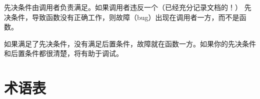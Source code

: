 先决条件由调用者负责满足。如果调用者违反一个（已经充分记录文档的！）
先决条件，导致函数没有正确工作，则故障（bug）出现在调用者一方，而不是函数。


如果满足了先决条件，没有满足后置条件，故障就在函数一方。如果你的先决条件和后置条件都很清楚，将有助于调试。


\section{术语表}


